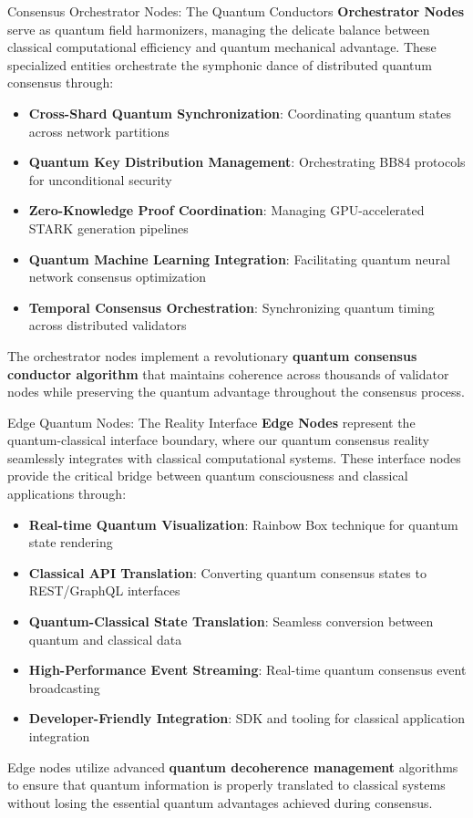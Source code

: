 \documentclass[11pt,a4paper]{article}
\begin{document}
\begin{nodebox}{Consensus Orchestrator Nodes: The Quantum Conductors}
\textbf{Orchestrator Nodes} serve as quantum field harmonizers, managing the delicate balance between classical computational efficiency and quantum mechanical advantage. These specialized entities orchestrate the symphonic dance of distributed quantum consensus through:

\begin{itemize}
\item \textbf{Cross-Shard Quantum Synchronization}: Coordinating quantum states across network partitions
\item \textbf{Quantum Key Distribution Management}: Orchestrating BB84 protocols for unconditional security
\item \textbf{Zero-Knowledge Proof Coordination}: Managing GPU-accelerated STARK generation pipelines
\item \textbf{Quantum Machine Learning Integration}: Facilitating quantum neural network consensus optimization
\item \textbf{Temporal Consensus Orchestration}: Synchronizing quantum timing across distributed validators
\end{itemize}

The orchestrator nodes implement a revolutionary \textbf{quantum consensus conductor algorithm} that maintains coherence across thousands of validator nodes while preserving the quantum advantage throughout the consensus process.
\end{nodebox}

\begin{nodebox}{Edge Quantum Nodes: The Reality Interface}
\textbf{Edge Nodes} represent the quantum-classical interface boundary, where our quantum consensus reality seamlessly integrates with classical computational systems. These interface nodes provide the critical bridge between quantum consciousness and classical applications through:

\begin{itemize}
\item \textbf{Real-time Quantum Visualization}: Rainbow Box technique for quantum state rendering
\item \textbf{Classical API Translation}: Converting quantum consensus states to REST/GraphQL interfaces
\item \textbf{Quantum-Classical State Translation}: Seamless conversion between quantum and classical data
\item \textbf{High-Performance Event Streaming}: Real-time quantum consensus event broadcasting
\item \textbf{Developer-Friendly Integration}: SDK and tooling for classical application integration
\end{itemize}

Edge nodes utilize advanced \textbf{quantum decoherence management} algorithms to ensure that quantum information is properly translated to classical systems without losing the essential quantum advantages achieved during consensus.
\end{nodebox}
\end{document}
